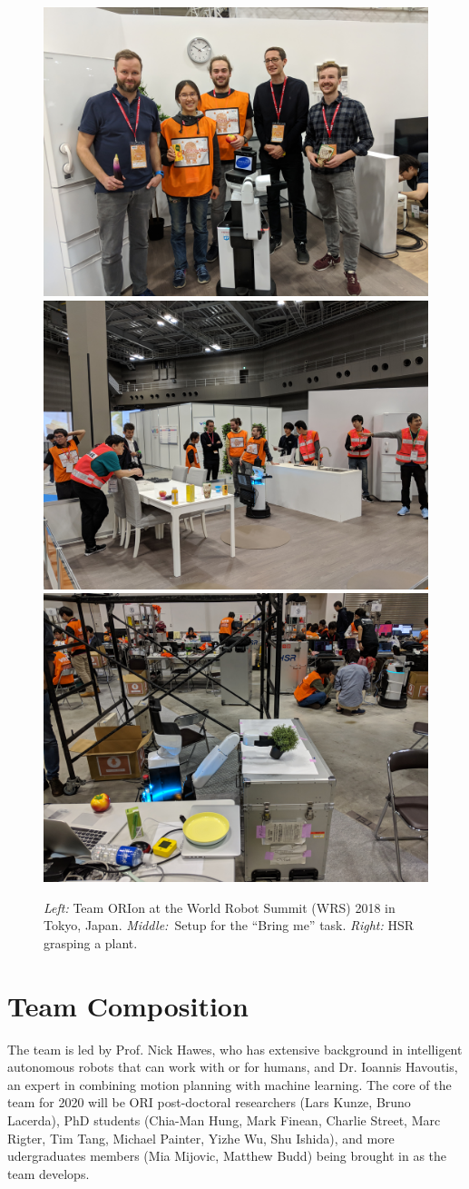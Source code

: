 \documentclass[runningheads,a4paper]{llncs}
\begin{document}
\begin{figure}[tb]
  \begin{center}
    \includegraphics[width=.32\columnwidth, clip, trim=0 0ex 0ex 50ex]{images/team_orion.jpg}
    \includegraphics[width=.32\columnwidth, clip, trim=0 0ex 0ex 50ex]{images/bring_me.jpg}
    \includegraphics[width=.32\columnwidth, clip, trim=0 0ex 0ex 50ex]{images/hsr_grasping.jpg}
  \end{center} 
  \caption{\emph{Left:} Team ORIon at the World Robot Summit (WRS) 2018 in Tokyo, Japan. \emph{Middle:}~Setup for the ``Bring me'' task. \emph{Right:} HSR grasping a plant.}
  \label{fig:wrs}
\end{figure}


\section{Team Composition}

The team is led by Prof. Nick Hawes, who has extensive background in
intelligent autonomous robots that can work with or for humans, and Dr. Ioannis Havoutis, an expert in combining motion planning with machine learning. The core of the team for 2020 will be ORI post-doctoral researchers (Lars Kunze, Bruno Lacerda), PhD students (Chia-Man Hung, Mark Finean, Charlie Street, Marc Rigter, Tim Tang, Michael Painter, Yizhe Wu, Shu Ishida), and more udergraduates members (Mia Mijovic, Matthew Budd) being brought in as the team develops. 
\end{document}
